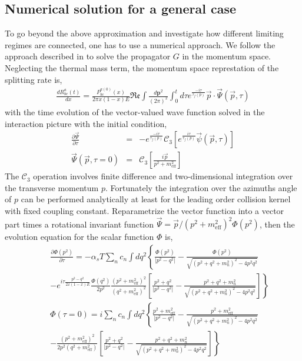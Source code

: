 \subsection{Numerical solution for a general case}
To go beyond the above approximation and investigate how different limiting regimes are connected, one has to use a numerical approach.
We follow the approach described in \cite{CaronHuot:2010bp} to solve the propagator $G$ in the momentum space.
Neglecting the thermal mass term, the momentum space represtation of the splitting rate is,
\begin{eqnarray}
\frac{dR^{a}_{bc}(t)}{dx} = \frac{P^{a(0)}_{bc}(x)}{2\pi x(1-x)E} \mathfrak{Re} \int \frac{d\mathbf{p}^2}{(2\pi)^2} \int_0^t d\tau e^{\frac{-i\tau}{\tau_f(p)}} \vec{p}\cdot \vec{\Psi}(\vec{p}, \tau)
\end{eqnarray}
with the time evolution of the vector-valued wave function solved in the interaction picture with the initial condition,
\begin{eqnarray}
\frac{\partial \vec{\Psi}}{\partial \tau} &=& - e^{\frac{-i\tau}{\tau_f(p)}} \mathcal{C}_3\left[e^{\frac{i\tau}{\tau_f(p)}}\vec{\psi}(\vec{p}, \tau)\right]\\
\vec{\Psi}(\vec{p}, \tau=0) &=& \mathcal{C}_3\left[\frac{i\vec{p}}{p^2+m^2_{\textrm{eff}}}\right]
\end{eqnarray}
The $\mathcal{C}_3$ operation involves finite difference and two-dimensional integration over the transverse momentum $p$. 
Fortunately the integration over the azimuths angle of $p$ can be performed analytically at least for the leading order collision kernel with fixed coupling constant.
Reparametrize the vector function into a vector part times a rotational invariant function $\vec{\Psi} = \vec{p}/(p^2+m^2_{\textrm{eff}})^2 \Phi(p^2)$, then the evolution equation for the scalar function $\Phi$ is,
\begin{eqnarray}
&&\frac{\partial \Phi(p^2)}{\partial \tau} = - \alpha_s T \sum_n c_n \int dq^2 \left\{\frac{\Phi(p^2)}{|p^2-q^2|} - \frac{\Phi(p^2)}{\sqrt{(p^2+q^2+m_n^2)^2 - 4p^2q^2}}\right. \\\nonumber
&&\left.- e^{i\tau\frac{p^2-q^2}{2x(1-x)E}}\frac{\Phi(q^2)}{2p^2}\frac{(p^2+m^2_{\textrm{eff}})^2}{(q^2+m^2_{\textrm{eff}})^2} \left[\frac{p^2+q^2}{|p^2-q^2|} - \frac{p^2+q^2+m_n^2}{\sqrt{(p^2+q^2+m_n^2)^2 - 4p^2q^2}}\right]\right\}\\
&&\Phi(\tau=0)= i\sum_n c_n \int dq^2 \left\{\frac{p^2+m^2_{\textrm{eff}}}{|p^2-q^2|} - \frac{p^2+m^2_{\textrm{eff}}}{\sqrt{(p^2+q^2+m_n^2)^2 - 4p^2q^2}}\right. \\\nonumber
&&\left.-\frac{(p^2+m^2_{\textrm{eff}})^2}{2p^2(q^2+m^2_{\textrm{eff}})} \left[\frac{p^2+q^2}{|p^2-q^2|} - \frac{p^2+q^2+m_n^2}{\sqrt{(p^2+q^2+m_n^2)^2 - 4p^2q^2}}\right]\right\}
\end{eqnarray}
